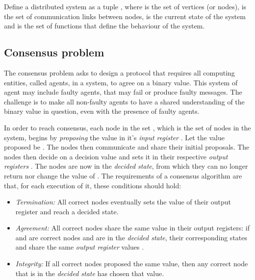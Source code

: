 Define a distributed system as a tuple , where  is the set of vertices (or nodes),  is the set of communication links between nodes,  is the current state of the system and  is the set of functions that define the behaviour of the system.

\subsection{Consensus problem}

The consensus problem asks to design a protocol that requires all computing entities, called agents, in a system, to agree on a binary value. This system of agent may include faulty agents, that may fail or produce faulty messages. The challenge is to make all non-faulty agents to have a shared understanding of the binary value in question, even with the presence of faulty agents. 

In order to reach consensus, each node in the set , which is the set of nodes in the system, begins by \emph{proposing} the value in it's \emph{input register} . Let the value proposed be . The nodes then communicate and share their initial proposals. The nodes then decide on a decision value  and sets it in their respective \emph{output registers} . The nodes are now in the \emph{decided state}, from which they can no longer return nor change the value of . The requirements of a consensus algorithm are that, for each execution of it, these conditions should hold:

\begin{itemize}[label={}]
  \item \emph{Termination:} All correct nodes eventually sets the value of their output register and reach a decided state.
  \item \emph{Agreement:} All correct nodes share the same value in their output registers: if  and  are correct nodes and are in the \emph{decided state}, their corresponding states  and  share the same \emph{output register} values .
  \item \emph{Integrity:} If all correct nodes proposed the same value, then any correct node that is in the \emph{decided state} has chosen that value.
\end{itemize}


